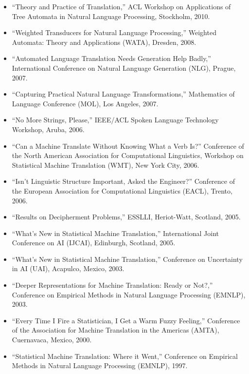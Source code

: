 \begin{itemize}
\item ``Theory and Practice of Translation,'' ACL Workshop on Applications of Tree Automata in Natural Language Processing, Stockholm, 2010.
\item ``Weighted Transducers for Natural Language Processing,'' Weighted Automata: Theory and Applications (WATA), Dresden, 2008.
\item ``Automated Language Translation Needs Generation Help Badly,'' International Conference on Natural Language Generation (NLG), Prague, 2007.
\item ``Capturing Practical Natural Language Transformations,'' Mathematics of Language Conference (MOL), Los Angeles, 2007.
\item ``No More Strings, Please,'' IEEE/ACL Spoken Language Technology Workshop, Aruba, 2006.
\item ``Can a Machine Translate Without Knowing What a Verb Is?'' Conference of the North American Association for Computational Linguistics, Workshop on Statistical Machine Translation (WMT), New York City, 2006.
\item ``Isn't Linguistic Structure Important, Asked the Engineer?'' Conference of the European Association for Computational Linguistics (EACL), Trento, 2006.
\item ``Results on Decipherment Problems,'' ESSLLI, Heriot-Watt, Scotland, 2005.
\item ``What's New in Statistical Machine Translation,'' International Joint Conference on AI (IJCAI), Edinburgh, Scotland, 2005.
\item ``What's New in Statistical Machine Translation,'' Conference on Uncertainty in AI (UAI), Acapulco, Mexico, 2003.
\item ``Deeper Representations for Machine Translation: Ready or Not?,'' Conference on Empirical Methods in Natural Language Processing (EMNLP), 2003.
\item ``Every Time I Fire a Statistician, I Get a Warm Fuzzy Feeling,'' Conference of the Association for Machine Translation in the Americas (AMTA), Cuernavaca, Mexico, 2000.
\item ``Statistical Machine Translation: Where it Went,'' Conference on Empirical Methods in Natural Language Processing (EMNLP), 1997.
\end{itemize}



